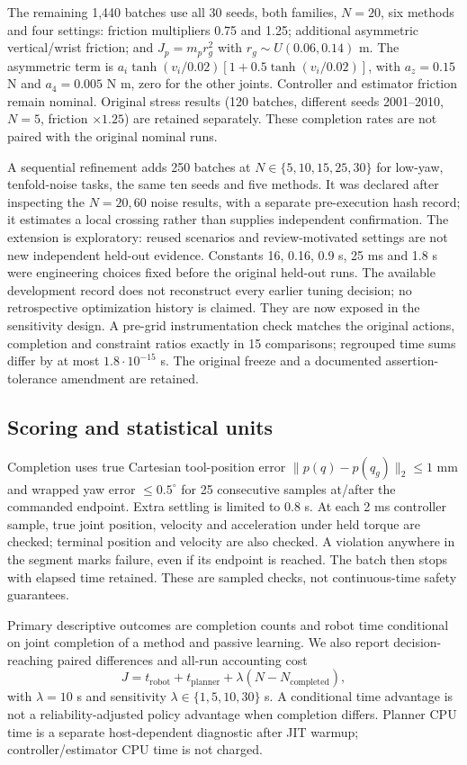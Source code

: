 \documentclass[10pt,twocolumn]{article}
\begin{document}
The remaining 1,440 batches use all 30 seeds, both families, $N=20$, six methods and four settings: friction multipliers 0.75 and 1.25; additional asymmetric vertical/wrist friction; and $J_p=m_p r_g^2$ with $r_g\sim U(0.06,0.14)$ m. The asymmetric term is $a_i\tanh(v_i/0.02)[1+0.5\tanh(v_i/0.02)]$, with $a_z=0.15$ N and $a_4=0.005$ N m, zero for the other joints. Controller and estimator friction remain nominal. Original stress results (120 batches, different seeds 2001--2010, $N=5$, friction $\times1.25$) are retained separately. These completion rates are not paired with the original nominal runs.

A sequential refinement adds 250 batches at $N\in\{5,10,15,25,30\}$ for low-yaw, tenfold-noise tasks, the same ten seeds and five methods. It was declared after inspecting the $N=20,60$ noise results, with a separate pre-execution hash record; it estimates a local crossing rather than supplies independent confirmation. The extension is exploratory: reused scenarios and review-motivated settings are not new independent held-out evidence. Constants 16, 0.16, 0.9 s, 25 ms and 1.8 s were engineering choices fixed before the original held-out runs. The available development record does not reconstruct every earlier tuning decision; no retrospective optimization history is claimed. They are now exposed in the sensitivity design. A pre-grid instrumentation check matches the original actions, completion and constraint ratios exactly in 15 comparisons; regrouped time sums differ by at most $1.8\cdot10^{-15}$ s. The original freeze and a documented assertion-tolerance amendment are retained.

\subsection{Scoring and statistical units}
Completion uses true Cartesian tool-position error $\|p(q)-p(q_g)\|_2\leq1$ mm and wrapped yaw error $\leq0.5^\circ$ for 25 consecutive samples at/after the commanded endpoint. Extra settling is limited to 0.8 s. At each 2 ms controller sample, true joint position, velocity and acceleration under held torque are checked; terminal position and velocity are also checked. A violation anywhere in the segment marks failure, even if its endpoint is reached. The batch then stops with elapsed time retained. These are sampled checks, not continuous-time safety guarantees.

Primary descriptive outcomes are completion counts and robot time conditional on joint completion of a method and passive learning. We also report decision-reaching paired differences and all-run accounting cost
\begin{equation}
 J=t_{\mathrm{robot}}+t_{\mathrm{planner}}+\lambda(N-N_{\mathrm{completed}}),
\end{equation}
with $\lambda=10$ s and sensitivity $\lambda\in\{1,5,10,30\}$ s. A conditional time advantage is not a reliability-adjusted policy advantage when completion differs. Planner CPU time is a separate host-dependent diagnostic after JIT warmup; controller/estimator CPU time is not charged.
\end{document}

